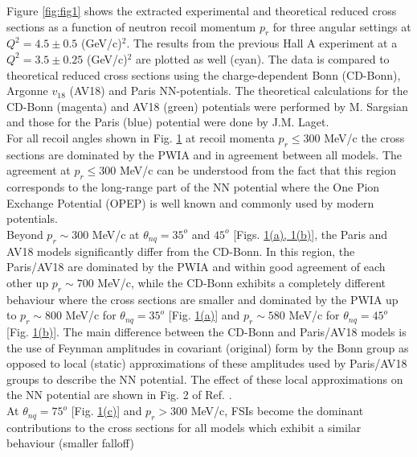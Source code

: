 \indent Figure \ref{fig:fig1} shows the extracted experimental and theoretical reduced cross sections as a function of neutron recoil momentum $p_{r}$ for three angular settings at $Q^{2}=4.5\pm0.5$
(GeV/c)$^{2}$. The results from the previous Hall A experiment\cite{PhysRevLett.107.262501} at a $Q^{2}=3.5\pm0.25$ (GeV/c)$^{2}$ are plotted as well (cyan). The data is compared to theoretical reduced
cross sections using the charge-dependent Bonn (CD-Bonn)\cite{PhysRevC.63.024001}, Argonne $v_{18}$ (AV18)\cite{PhysRevC.51.38} and Paris\cite{PhysRevC.21.861} NN-potentials. The theoretical calculations
for the CD-Bonn (magenta) and AV18 (green) potentials were performed by M. Sargsian\cite{PhysRevC.82.014612} and those for the Paris (blue) potential were done by J.M. Laget\cite{LAGET2005}. \\
\indent For all recoil angles shown in Fig. \hyperref[fig:fig1]{1} at recoil momenta $p_{r}\leq$300 MeV/c the cross sections are dominated by the PWIA and in agreement between all models.
The agreement at $p_{r}\leq300$ MeV/c can be understood from the fact that this region corresponds to the long-range part of the NN potential where the One Pion Exchange Potential (OPEP) is well known and commonly
used by modern potentials. \\
\indent Beyond $p_{r}\sim$300 MeV/c at $\theta_{nq}=35^{o}$ and $45^{o}$ [Figs. \hyperref[fig:fig1]{1(a), 1(b)}], the Paris and
AV18 models significantly differ from the CD-Bonn. In this region, the Paris/AV18 are dominated by the PWIA and within good agreement of each other up $p_{r}\sim700$ MeV/c, while the CD-Bonn exhibits a completely different
behaviour where the cross sections are smaller and dominated by the PWIA up to $p_{r}\sim800$ MeV/c for $\theta_{nq}=35^{o}$ [Fig. \hyperref[fig:fig1]{1(a)}] and $p_{r}\sim580$ MeV/c for $\theta_{nq}=45^{o}$ [Fig. \hyperref[fig:fig1]{1(b)}].
The main difference between the CD-Bonn and Paris/AV18 models is the use of Feynman amplitudes in covariant (original) form by the Bonn group as opposed to local (static) approximations of these amplitudes used by Paris/AV18 groups
to describe the NN potential. The effect of these local approximations on the NN potential are shown in Fig. 2 of Ref. \cite{PhysRevC.63.024001}. \\
\indent At $\theta_{nq}=75^{o}$ [Fig. \hyperref[fig:fig1]{1(c)}] and $p_{r}>300$ MeV/c, FSIs become the dominant contributions to the cross sections for all models which exhibit a similar behaviour (smaller falloff) 
